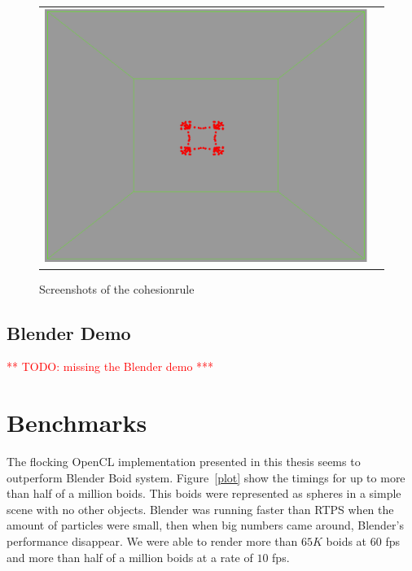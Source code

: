 \begin{figure}[htbp]
\begin{center}
\begin{tabular}{cc}
\includegraphics[scale= 0.15]{figures/coh4.eps}
\end{tabular}
\end{center}
\caption{Screenshots of the cohesionrule}
\label{cohRule}
\end{figure}

\subsection{Blender Demo}
\textcolor{red}{** TODO: missing the Blender demo ***}

\section{Benchmarks}

The flocking OpenCL implementation presented in this thesis seems to outperform Blender Boid system. Figure~\ref{plot} show the timings for up to more than half of a million boids. This boids were represented as spheres in a simple scene with no other objects. Blender was running faster than RTPS when the amount of particles were small, then when big numbers came around, Blender's performance disappear.  We were able to render more than $65K$ boids at $60$ fps and more than half of a million boids at a rate of $10$ fps.


